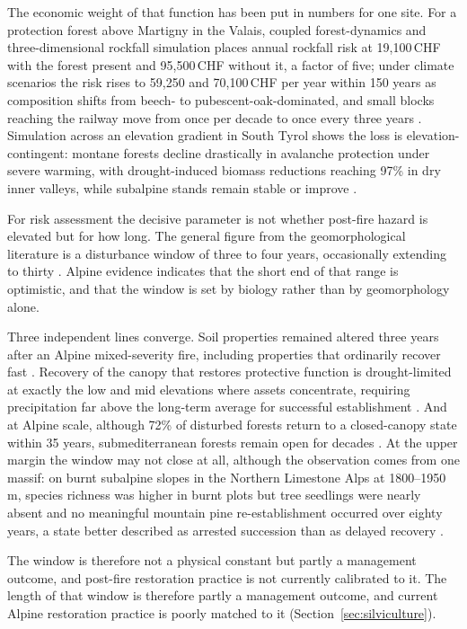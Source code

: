 \documentclass[11pt,a4paper]{article}
\begin{document}
The economic weight of that function has been put in numbers for one site. For a protection forest above Martigny in the Valais, coupled forest-dynamics and three-dimensional rockfall simulation places annual rockfall risk at 19{,}100\,CHF with the forest present and 95{,}500\,CHF without it, a factor of five; under climate scenarios the risk rises to 59{,}250 and 70{,}100\,CHF per year within 150 years as composition shifts from beech- to pubescent-oak-dominated, and small blocks reaching the railway move from once per decade to once every three years \citep{moos_climate_2021}. Simulation across an elevation gradient in South Tyrol shows the loss is elevation-contingent: montane forests decline drastically in avalanche protection under severe warming, with drought-induced biomass reductions reaching 97\% in dry inner valleys, while subalpine stands remain stable or improve \citep{hillebrand_contrasting_2023}.

For risk assessment the decisive parameter is not whether post-fire hazard is elevated but for how long. The general figure from the geomorphological literature is a disturbance window of three to four years, occasionally extending to thirty \citep{santi_wildfire_2022}. Alpine evidence indicates that the short end of that range is optimistic, and that the window is set by biology rather than by geomorphology alone.

Three independent lines converge. Soil properties remained altered three years after an Alpine mixed-severity fire, including properties that ordinarily recover fast \citep{negri_wildfire_2026}. Recovery of the canopy that restores protective function is drought-limited at exactly the low and mid elevations where assets concentrate, requiring precipitation far above the long-term average for successful establishment \citep{moser_potential_2010}. And at Alpine scale, although 72\% of disturbed forests return to a closed-canopy state within 35 years, submediterranean forests remain open for decades \citep{stritih_alternative_2023}. At the upper margin the window may not close at all, although the observation comes from one massif: on burnt subalpine slopes in the Northern Limestone Alps at 1800--1950\,m, species richness was higher in burnt plots but tree seedlings were nearly absent and no meaningful mountain pine re-establishment occurred over eighty years, a state better described as arrested succession than as delayed recovery \citep{degiuli_arrested_2024}.

The window is therefore not a physical constant but partly a management outcome, and post-fire restoration practice is not currently calibrated to it. The length of that window is therefore partly a management outcome, and current Alpine restoration practice is poorly matched to it (Section~\ref{sec:silviculture}).
\end{document}
